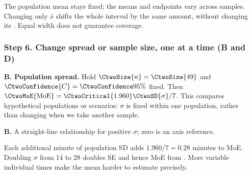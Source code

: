 The population mean stays fixed; the means and endpoints vary across samples.
Changing only $\bar{x}$ shifts the whole interval by the same amount, without
changing its . Equal width does not guarantee coverage.
\par\vspace{3mm}

\clearpage
\subsubsection*{Step 6. Change spread or sample size, one at a time (B and D)}
\textbf{B. Population spread.} Hold $\CtwoSize{n}=\CtwoSize{49}$ and
$\CtwoConfidence{C}=\CtwoConfidence{95\%}$ fixed. Then
$\CtwoMoE{\mathrm{MoE}}=\CtwoCritical{1.960}\CtwoSD{\sigma}/7$.
This compares hypothetical populations or scenarios: $\sigma$ is fixed within
one population, rather than changing when we take another sample.
\begin{center}
\par\small\textbf{B.} A straight-line relationship for positive $\sigma$; zero is an axis reference.
\end{center}
Each additional minute of population SD adds $1.960/7=0.28$ minutes to MoE.
Doubling $\sigma$ from 14 to 28 doubles SE and hence MoE from
. More variable individual times make the mean harder to estimate precisely.

